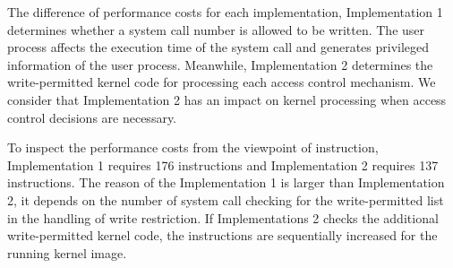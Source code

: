 %
The difference of performance costs for each implementation, Implementation 1
determines whether a system call number is allowed to be written. 
The user process affects the execution time of the system call and generates
privileged information of the user process.
%
Meanwhile, Implementation 2 determines the write-permitted kernel code for
processing each access control mechanism.
%
We consider that Implementation 2 has an impact on kernel processing when
access control decisions are necessary.
%

%  

To inspect the performance costs from the viewpoint of instruction,
Implementation 1 requires 176 instructions and Implementation 2 requires 137
instructions.
%
The reason of the Implementation 1 is larger than Implementation 2,  
it depends on the number of system call checking for the write-permitted list in
the handling of write restriction.
%
If Implementations 2 checks the additional write-permitted kernel code, the
instructions are sequentially increased for the running kernel image.

%


